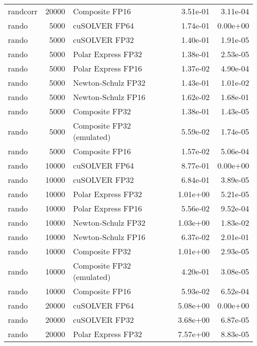 \begin{table}
\begin{tabular}{lrlrr}
 randcorr & 20000 &            Composite FP16 &  3.51e-01 &        3.11e-04 \\
    rando &  5000 &             cuSOLVER FP64 &  1.74e-01 &        0.00e+00 \\
    rando &  5000 &             cuSOLVER FP32 &  1.40e-01 &        1.91e-05 \\
    rando &  5000 &        Polar Express FP32 &  1.38e-01 &        2.53e-05 \\
    rando &  5000 &        Polar Express FP16 &  1.37e-02 &        4.90e-04 \\
    rando &  5000 &        Newton-Schulz FP32 &  1.43e-01 &        1.01e-02 \\
    rando &  5000 &        Newton-Schulz FP16 &  1.62e-02 &        1.68e-01 \\
    rando &  5000 &            Composite FP32 &  1.38e-01 &        1.43e-05 \\
    rando &  5000 & Composite FP32 (emulated) &  5.59e-02 &        1.74e-05 \\
    rando &  5000 &            Composite FP16 &  1.57e-02 &        5.06e-04 \\
    rando & 10000 &             cuSOLVER FP64 &  8.77e-01 &        0.00e+00 \\
    rando & 10000 &             cuSOLVER FP32 &  6.84e-01 &        3.89e-05 \\
    rando & 10000 &        Polar Express FP32 &  1.01e+00 &        5.21e-05 \\
    rando & 10000 &        Polar Express FP16 &  5.56e-02 &        9.52e-04 \\
    rando & 10000 &        Newton-Schulz FP32 &  1.03e+00 &        1.83e-02 \\
    rando & 10000 &        Newton-Schulz FP16 &  6.37e-02 &        2.01e-01 \\
    rando & 10000 &            Composite FP32 &  1.01e+00 &        2.93e-05 \\
    rando & 10000 & Composite FP32 (emulated) &  4.20e-01 &        3.08e-05 \\
    rando & 10000 &            Composite FP16 &  5.93e-02 &        6.52e-04 \\
    rando & 20000 &             cuSOLVER FP64 &  5.08e+00 &        0.00e+00 \\
    rando & 20000 &             cuSOLVER FP32 &  3.68e+00 &        6.87e-05 \\
    rando & 20000 &        Polar Express FP32 &  7.57e+00 &        8.83e-05 \\

\end{tabular}
\end{table}
